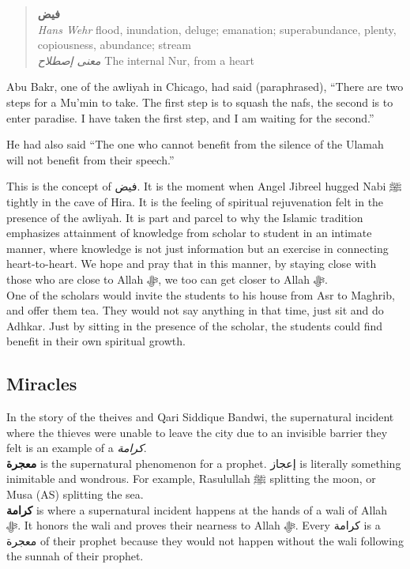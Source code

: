 \documentclass[
]{book}
\begin{document}
\begin{quote}
\textbf{فيض}\\
\emph{Hans Wehr} flood, inundation, deluge; emanation; superabundance, plenty, copiousness, abundance; stream\\
\emph{معنى إصطلاح} The internal Nur, from a heart
\end{quote}

Abu Bakr, one of the awliyah in Chicago, had said (paraphrased), ``There are two steps for a Mu'min to take. The first step is to squash the nafs, the second is to enter paradise. I have taken the first step, and I am waiting for the second.''

He had also said ``The one who cannot benefit from the silence of the Ulamah will not benefit from their speech.''

This is the concept of فيض. It is the moment when Angel Jibreel hugged Nabi ﷺ tightly in the cave of Hira. It is the feeling of spiritual rejuvenation felt in the presence of the awliyah. It is part and parcel to why the Islamic tradition emphasizes attainment of knowledge from scholar to student in an intimate manner, where knowledge is not just information but an exercise in connecting heart-to-heart. We hope and pray that in this manner, by staying close with those who are close to Allah ﷻ, we too can get closer to Allah ﷻ.\\
One of the scholars would invite the students to his house from Asr to Maghrib, and offer them tea. They would not say anything in that time, just sit and do Adhkar. Just by sitting in the presence of the scholar, the students could find benefit in their own spiritual growth.

\hypertarget{miracles}{%
\subsection{Miracles}\label{miracles}}

In the story of the theives and \protect\hypertarget{qari-siddique}{}{Qari Siddique Bandwi}, the supernatural incident where the thieves were unable to leave the city due to an invisible barrier they felt is an example of a \emph{كرامة}.\\
\textbf{معجرة} is the supernatural phenomenon for a prophet. إعجاز is literally something inimitable and wondrous. For example, Rasulullah ﷺ splitting the moon, or Musa (AS) splitting the sea.\\
\textbf{كرامة} is where a supernatural incident happens at the hands of a wali of Allah ﷻ. It honors the wali and proves their nearness to Allah ﷻ. Every كرامة is a معجرة of their prophet because they would not happen without the wali following the sunnah of their prophet.
\end{document}

